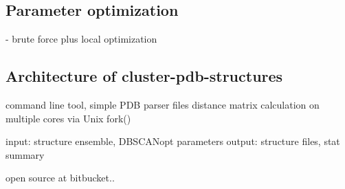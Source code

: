 \subsection{Parameter optimization}

        - brute force plus local optimization

\subsection{Architecture of cluster-pdb-structures}

            command line tool, simple PDB parser files
            distance matrix calculation on multiple cores via Unix fork()

            input: structure ensemble, DBSCANopt parameters
            output: structure files, stat summary


            open source at bitbucket..


